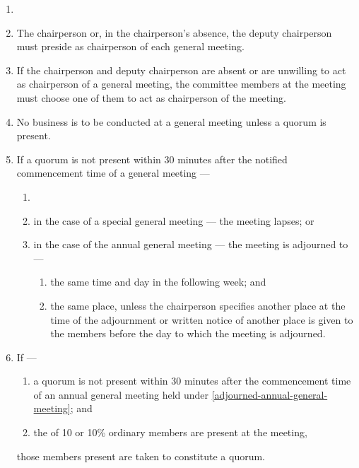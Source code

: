 \documentclass[../constitution.tex]{subfiles}
\begin{document}
\begin{enumerate}

\item {} 
\item The chairperson or, in the chairperson's absence, the deputy chairperson must preside as chairperson of each general meeting.
\item If the chairperson and deputy chairperson are absent or are unwilling to act as chairperson of a general meeting, the committee members at the meeting must choose one of them to act as chairperson of the meeting.
\item No business is to be conducted at a general meeting unless a quorum is present.
\item If a quorum is not present within 30 minutes after the notified commencement time of a general meeting ---

  \begin{enumerate}
  
  \item {}
  \item in the case of a special general meeting --- the meeting lapses; or
  \item in the case of the annual general meeting --- the meeting is adjourned to --- \label{adjourned-annual-general-meeting}

    \begin{enumerate}
    
    \item the same time and day in the following week; and
    \item the same place, unless the chairperson specifies another place at the time of the adjournment or written notice of another place is given to the members before the day to which the meeting is adjourned.
    \end{enumerate}
  \end{enumerate}
\item If ---

  \begin{enumerate}
  
  \item a quorum is not present within 30 minutes after the commencement time of an annual general meeting held under  \ref{adjourned-annual-general-meeting}; and
  \item the  of 10 or 10\% ordinary members are present at the meeting, 
  \end{enumerate}
  those members present are taken to constitute a quorum.
\end{enumerate}
\end{document}
